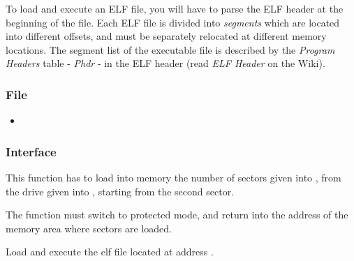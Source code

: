 To load and execute an ELF file, you will have to parse the ELF header at the
beginning of the file. Each ELF file is divided into \emph{segments} which are
located into different offsets, and must be separately relocated at different
memory locations. The segment list of the executable file is described by the
\emph{Program Headers} table - \emph{Phdr} - in the ELF header (read \emph{ELF Header} on the Wiki).

\subsubsection*{File}
\begin{itemize}
  \item {}
\end{itemize}

\subsubsection*{Interface}

{
  This function has to load into memory the number of sectors given into
  , from the drive given into , starting from
  the second sector.

  The function must switch to protected mode, and return into 
  the address of the memory area where sectors are loaded.
}

{
  Load and execute the elf file located at address .
}
